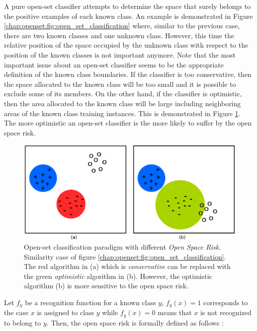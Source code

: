 A pure open-set classifier attempts to determine the space that surely belongs to the positive examples of each known class. An example is demonstrated in Figure \ref{chap:openset:fig:open_set_classification} where, similar to the previous case, there are two known classes and one unknown class. However, this time the relative position of the space occupied by the unknown class with respect to the position of the known classes is not important anymore. Note that the most important issue about an open-set classifier seems to be the appropriate definition of the known class boundaries. If the classifier is too conservative, then the space allocated to the known class will be too small and it is possible to exclude some of its members. On the other hand, if the classifier is optimistic, then the area allocated to the known class will be large including neighboring areas of the known class training instances. This is demonstrated in Figure \ref{chap:openset:fig:open_space_risk_schema}. The more optimistic an open-set classifier is the more likely to suffer by the open space risk.

\begin{figure}[t]
	\begin{center}
    	\includegraphics[scale=0.70]{Figures/open_space_risk_schema.eps}
		\caption{Open-set classification paradigm with different \textit{Open Space Risk}. Similarity case of figure \ref{chap:openset:fig:open_set_classification}. The red algorithm in (a) which is \textit{conservative} can be replaced with the green \textit{optimistic} algorithm in (b). However, the optimistic algorithm (b) is more sensitive to the open space risk.}
		\label{chap:openset:fig:open_space_risk_schema}
	\end{center}
\end{figure}


Let $f_y$ be a recognition function for a known class $y$, $f_y(x)=1$ corresponds to the case $x$ is assigned to class $y$ while $f_y(x)=0$ means that $x$ is not recognized to belong to $y$. Then, the open space risk is formally defined as follows \parencite{scheirer2013toward}:

